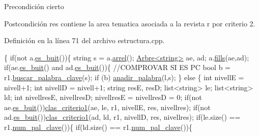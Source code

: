 \begin{DoxyPrecond}{Precondición}
cierto 
\end{DoxyPrecond}
\begin{DoxyPostcond}{Postcondición}
res contiene la area tematica asociada a la revista r por criterio 2. 
\end{DoxyPostcond}


Definición en la línea 71 del archivo estructura.\-cpp.


\begin{DoxyCode}
                                                                               
                                              \{
  \textcolor{keywordflow}{if}(not a.\hyperlink{class_arbre_a68a51f6689f0b2889e8e1d56266fd620}{es\_buit}())\{
    \textcolor{keywordtype}{string} s = a.\hyperlink{class_arbre_aa6e2559ead7dfceda962cff11fb1a15c}{arrel}();
    \hyperlink{class_arbre}{Arbre<string>} ae, ad;
    a.\hyperlink{class_arbre_aee75355cee7599e132de75781d26a61d}{fills}(ae,ad);
    \textcolor{keywordflow}{if}(ae.\hyperlink{class_arbre_a68a51f6689f0b2889e8e1d56266fd620}{es\_buit}() and ad.\hyperlink{class_arbre_a68a51f6689f0b2889e8e1d56266fd620}{es\_buit}())\{
      \textcolor{comment}{//COMPROVAR SI ES PC}
      \textcolor{keywordtype}{bool} b = r1.\hyperlink{class_revista_a5a6f6d3a8f5ef4f233d794a705b686c6}{buscar\_palabra\_clave}(s);
      \textcolor{keywordflow}{if} (b) \hyperlink{class_estructura_ae0d36375f1d4050785373f843f590e96}{anadir\_palabra}(l,s);
    \}
    \textcolor{keywordflow}{else} \{
      \textcolor{keywordtype}{int} nivellE = nivell+1;
      \textcolor{keywordtype}{int} nivellD = nivell+1;
      \textcolor{keywordtype}{string} resE, resD;
      list<string> le;
      list<string> ld;
      \textcolor{keywordtype}{int} nivellresE, nivellresD;
      nivellresE = nivellresD = 0;
      \textcolor{keywordflow}{if}(not ae.\hyperlink{class_arbre_a68a51f6689f0b2889e8e1d56266fd620}{es\_buit}())\hyperlink{class_estructura_a29c1a2b17790a498dfa27bb626a2407f}{clas\_criterio1}(ae, le, r1, 
      nivellE, res, nivellres);
      \textcolor{keywordflow}{if}(not ad.\hyperlink{class_arbre_a68a51f6689f0b2889e8e1d56266fd620}{es\_buit}())\hyperlink{class_estructura_a29c1a2b17790a498dfa27bb626a2407f}{clas\_criterio1}(ad, ld, r1, 
      nivellD, res, nivellres);
      \textcolor{keywordflow}{if}(le.size() == r1.\hyperlink{class_revista_ae9f679caa49af37009e53cd0bce98831}{num\_pal\_clave}())\{
        \textcolor{keywordflow}{if}(ld.size() == r1.\hyperlink{class_revista_ae9f679caa49af37009e53cd0bce98831}{num\_pal\_clave}())\{

\end{DoxyCode}
